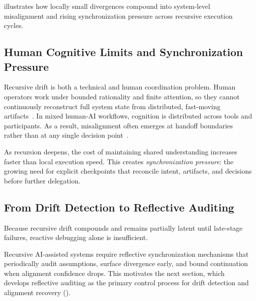  illustrates how locally small divergences compound into system-level misalignment and rising synchronization pressure across recursive execution cycles.

\subsection{Human Cognitive Limits and Synchronization Pressure}

Recursive drift is both a technical and human coordination problem. Human operators work under bounded rationality and finite attention, so they cannot continuously reconstruct full system state from distributed, fast-moving artifacts~\cite{Simon1957ModelsMan,Sweller1988CognitiveLoad}. In mixed human-AI workflows, cognition is distributed across tools and participants. As a result, misalignment often emerges at handoff boundaries rather than at any single decision point~\cite{Hutchins1995CognitionWild}.

As recursion deepens, the cost of maintaining shared understanding increases faster than local execution speed. This creates \textit{synchronization pressure}: the growing need for explicit checkpoints that reconcile intent, artifacts, and decisions before further delegation.

\subsection{From Drift Detection to Reflective Auditing}

Because recursive drift compounds and remains partially latent until late-stage failures, reactive debugging alone is insufficient.

Recursive AI-assisted systems require reflective synchronization mechanisms that periodically audit assumptions, surface divergence early, and bound continuation when alignment confidence drops. This motivates the next section, which develops reflective auditing as the primary control process for drift detection and alignment recovery ().
